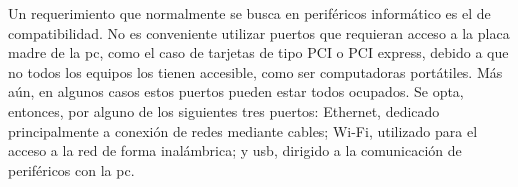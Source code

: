 



Un requerimiento que normalmente se busca en periféricos informático es el de compatibilidad. No es conveniente utilizar puertos que requieran acceso a la placa madre de la \acrshort{pc}, como el caso de tarjetas de tipo PCI o PCI express, debido a que no todos los equipos los tienen accesible, como ser computadoras portátiles. Más aún, en algunos casos estos puertos pueden estar todos ocupados. Se opta, entonces, por alguno de los siguientes tres puertos: Ethernet, dedicado principalmente a conexión de redes mediante cables; Wi-Fi, utilizado para el acceso a la red de forma inalámbrica; y \acrshort{usb}, dirigido a la comunicación de periféricos con la \acrshort{pc}.%

